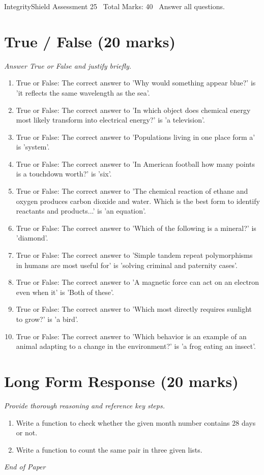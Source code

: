 \documentclass[12pt]{article}
\begin{document}
\begin{center}
IntegrityShield Assessment 25 \
Total Marks: 40 \
Answer all questions.
\end{center}

\section*{True / False (20 marks)}
\textit{Answer True or False and justify briefly.}
\begin{enumerate}[label=\arabic*.]
\item True or False: The correct answer to 'Why would something appear blue?' is 'it reflects the same wavelength as the sea'.
\item True or False: The correct answer to 'In which object does chemical energy most likely transform into electrical energy?' is 'a television'.
\item True or False: The correct answer to 'Populations living in one place form a' is 'system'.
\item True or False: The correct answer to 'In American football how many points is a touchdown worth?' is 'six'.
\item True or False: The correct answer to 'The chemical reaction of ethane and oxygen produces carbon dioxide and water. Which is the best form to identify reactants and products...' is 'an equation'.
\item True or False: The correct answer to 'Which of the following is a mineral?' is 'diamond'.
\item True or False: The correct answer to 'Simple tandem repeat polymorphisms in humans are most useful for' is 'solving criminal and paternity cases'.
\item True or False: The correct answer to 'A magnetic force can act on an electron even when it' is 'Both of these'.
\item True or False: The correct answer to 'Which most directly requires sunlight to grow?' is 'a bird'.
\item True or False: The correct answer to 'Which behavior is an example of an animal adapting to a change in the environment?' is 'a frog eating an insect'.
\end{enumerate}

\section*{Long Form Response (20 marks)}
\textit{Provide thorough reasoning and reference key steps.}
\begin{enumerate}[label=\arabic*.]
\item Write a function to check whether the given month number contains 28 days or not.
\item Write a function to count the same pair in three given lists.
\end{enumerate}

\vfill
\noindent\textit{End of Paper}
\end{document}
